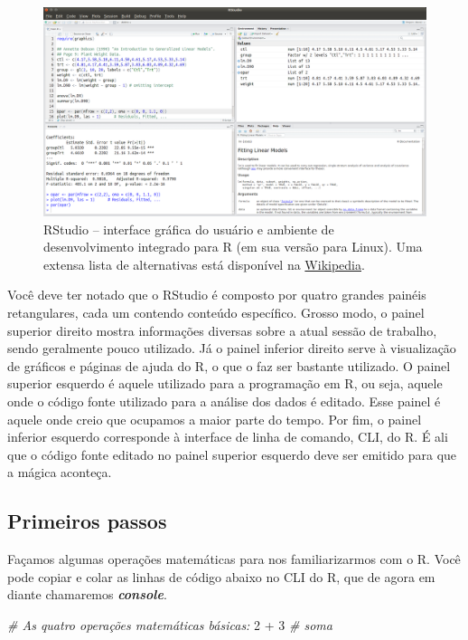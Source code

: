 \documentclass[]{book}
\newenvironment{Shaded}{\begin{snugshade}}{\end{snugshade}}
\newcommand{\DecValTok}[1]{\textcolor[rgb]{0.00,0.00,0.81}{{#1}}}
\newcommand{\StringTok}[1]{\textcolor[rgb]{0.31,0.60,0.02}{{#1}}}
\newcommand{\CommentTok}[1]{\textcolor[rgb]{0.56,0.35,0.01}{\textit{{#1}}}}
\newcommand{\NormalTok}[1]{{#1}}
\begin{document}
\begin{figure}[htbp]
\centering
\includegraphics{images/rstudio-snapshot.png}
\caption{RStudio -- interface gráfica do usuário e ambiente de
desenvolvimento integrado para R (em sua versão para Linux). Uma extensa
lista de alternativas está disponível na
\href{https://en.wikipedia.org/wiki/R_(programming_language)\#Interfaces}{Wikipedia}.}
\end{figure}

Você deve ter notado que o RStudio é composto por quatro grandes painéis
retangulares, cada um contendo conteúdo específico. Grosso modo, o
painel superior direito mostra informações diversas sobre a atual sessão
de trabalho, sendo geralmente pouco utilizado. Já o painel inferior
direito serve à visualização de gráficos e páginas de ajuda do R, o que
o faz ser bastante utilizado. O painel superior esquerdo é aquele
utilizado para a programação em R, ou seja, aquele onde o código fonte
utilizado para a análise dos dados é editado. Esse painel é aquele onde
creio que ocupamos a maior parte do tempo. Por fim, o painel inferior
esquerdo corresponde à interface de linha de comando, CLI, do R. É ali
que o código fonte editado no painel superior esquerdo deve ser emitido
para que a mágica aconteça.

\subsection{Primeiros passos}\label{primeiros-passos}

Façamos algumas operações matemáticas para nos familiarizarmos com o R.
Você pode copiar e colar as linhas de código abaixo no CLI do R, que de
agora em diante chamaremos \textbf{\emph{console}}.

\begin{Shaded}
\begin{Highlighting}[]
\CommentTok{# As quatro operações matemáticas básicas:}
\DecValTok{2} \NormalTok{+}\StringTok{ }\DecValTok{3} \CommentTok{# soma}
\end{Highlighting}
\end{Shaded}
\end{document}
